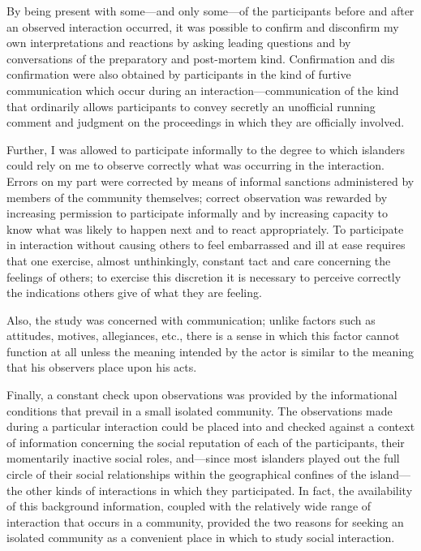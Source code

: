 \documentclass[twoside,symmetric,nobib,justified]{tufte-book}
\begin{document}
By being present with some---and only some---of the participants before
and after an observed interaction occurred, it was possible to confirm
and disconfirm my own interpretations and reactions by asking leading
questions and by conversations of the preparatory and post-mortem kind.
Confirmation and dis confirmation were also obtained by participants in
the kind of furtive communication which occur during an
interaction---communication of the kind that ordinarily allows
participants to convey secretly an unofficial running comment and
judgment on the proceedings in which they are officially involved.

Further, I was allowed to participate informally to the degree to which
islanders could rely on me to observe correctly what was occurring in
the interaction. Errors on my part were corrected by means of informal
sanctions administered by members of the community themselves; correct
observation was rewarded by increasing permission to participate
informally and by increasing capacity to know what was likely to happen
next and to react appropriately. To participate in interaction without
causing others to feel embarrassed and ill at ease requires that one
exercise, almost unthinkingly, constant tact and care concerning the
feelings of others; to exercise this discretion it is necessary to
perceive correctly the indications others give of what they are feeling.

Also, the study was concerned with communication; unlike factors such as
attitudes, motives, allegiances, etc., there is a sense in which this
factor cannot function at all unless the meaning intended by the actor
is similar to the meaning that his observers place upon his acts.

Finally, a constant check upon observations was provided by the
informational conditions that prevail in a small isolated community. The
observations made during a particular interaction could be placed into
and checked against a context of information concerning the social
reputation of each of the participants, their momentarily inactive
social roles, and---since most islanders played out the full circle of
their social relationships within the geographical confines of the
island---the other kinds of interactions in which they participated. In
fact, the availability of this background information, coupled with the
relatively wide range of interaction that occurs in a community,
provided the two reasons for seeking an isolated community as a
convenient place in which to study social interaction.
\end{document}
